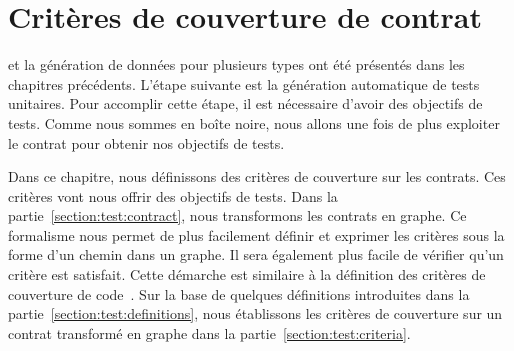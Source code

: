 \chapter{Critères de couverture de contrat}
\label{chapter:tests}

\mminitoc

 et la génération de données pour plusieurs types ont été présentés dans
les chapitres précédents. L'étape suivante est la génération automatique de
tests unitaires. Pour accomplir cette étape, il est nécessaire d'avoir des
objectifs de tests. Comme nous sommes en boîte noire, nous allons une fois de
plus exploiter le contrat pour obtenir nos objectifs de tests.

Dans ce chapitre, nous définissons des critères de couverture sur les contrats.
Ces critères vont nous offrir des objectifs de tests. Dans la
partie~\ref{section:test:contract}, nous transformons les contrats en graphe. Ce
formalisme nous permet de plus facilement définir et exprimer les critères sous
la forme d'un chemin dans un graphe. Il sera également plus facile de vérifier
qu'un critère est satisfait. Cette démarche est similaire à la définition des
critères de couverture de code~. Sur la base de quelques
définitions introduites dans la partie~\ref{section:test:definitions}, nous
établissons les critères de couverture sur un contrat transformé en graphe dans
la partie~\ref{section:test:criteria}.

